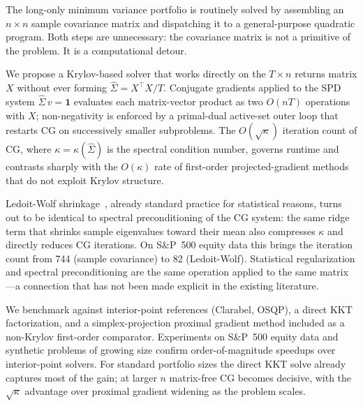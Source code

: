 The long-only minimum variance portfolio is routinely solved by assembling an $n\times n$
sample covariance matrix and dispatching it to a general-purpose quadratic program. Both
steps are unnecessary: the covariance matrix is not a primitive of the problem.
It is a computational detour.

We propose a Krylov-based solver that works directly on the $T\times n$ returns matrix $X$
without ever forming $\hat\Sigma = X^\top X/T$. Conjugate gradients applied to the SPD
system $\hat\Sigma\,v = \mathbf{1}$ evaluates each matrix-vector product
as two $O(nT)$ operations with $X$; non-negativity is enforced by a primal-dual
active-set outer loop that restarts CG on successively smaller subproblems.
The $O(\sqrt\kappa)$ iteration count of CG, where $\kappa = \kappa(\hat\Sigma)$ is the
spectral condition number, governs runtime and contrasts sharply with the $O(\kappa)$
rate of first-order projected-gradient methods that do not exploit Krylov structure.

Ledoit-Wolf shrinkage~\cite{ledoit2004}, already standard practice for statistical
reasons, turns out to be identical to spectral preconditioning of the CG system: the
same ridge term that shrinks sample eigenvalues toward their mean also compresses
$\kappa$ and directly reduces CG iterations. On S\&P~500 equity data this brings
the iteration count from 744 (sample covariance) to 82 (Ledoit-Wolf).
Statistical regularization and spectral preconditioning are the same operation applied
to the same matrix---a connection that has not been made explicit in the existing
literature.

We benchmark against interior-point references (Clarabel, OSQP), a direct KKT
factorization, and a simplex-projection proximal gradient method included as
a non-Krylov first-order comparator. Experiments on S\&P~500 equity data and
synthetic problems of growing size confirm order-of-magnitude speedups over
interior-point solvers. For standard portfolio sizes the direct KKT solve already
captures most of the gain; at larger $n$ matrix-free CG becomes decisive, with the
$\sqrt\kappa$ advantage over proximal gradient widening as the problem scales.

